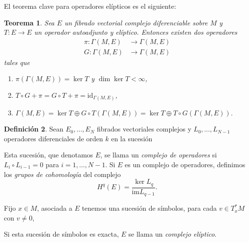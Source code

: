 \documentclass[12pt,a4paper]{article}
\newtheorem{thm}{Teorema}[section]
\theoremstyle{definition} \newtheorem{defn}[thm]{Definición}
\theoremstyle{definition} \newtheorem{ejemplo}[thm]{Ejemplo}
\theoremstyle{definition} \newtheorem{ejercicio}[thm]{Ejercicio}
\theoremstyle{remark} \newtheorem*{obs}{Observación}
\newcommand{\id}{\mathrm{id}}
\begin{document}
   El teorema clave para operadores elípticos es el siguiente:
   \begin{thm}\label{espectral}
     Sea $E$ un fibrado vectorial complejo diferenciable sobre $M$ y $T:E\rightarrow E$ un operador autoadjunto y elíptico. Entonces existen dos operadores
     \begin{align*}
       \pi:  \Gamma(M,E) &\longrightarrow \Gamma(M,E) \\ 
	 G:  \Gamma(M,E) &\longrightarrow \Gamma(M,E) 
       \end{align*}
       tales que
       \begin{enumerate}
	 \item $\pi(\Gamma(M,E))=\ker T$ y $\dim \ker T < \infty$,
	 \item $T\circ G +\pi=G\circ T + \pi = \id_{\Gamma(M,E)}$, 
	 \item $\Gamma(M,E)= \ker T \oplus G\circ T(\Gamma(M,E)) = \ker T \oplus T\circ G(\Gamma(M,E))$.
       \end{enumerate}
   \end{thm}
   \begin{defn}
     Sean $E_0,\dots,E_N$ fibrados vectoriales complejos y $L_0,\dots,L_{N-1}$ operadores diferenciales de orden $k$ en la sucesión
     \begin{center}
     \end{center}
     Esta sucesión, que denotamos $E$, se llama un \emph{complejo de operadores} si $L_i\circ L_{i-1}=0$ para $i=1,\dots,N-1$. Si $E$ es un complejo de operadores, definimos los \emph{grupos de cohomología} del complejo
     \begin{equation*}
       H^q(E)=\frac{\ker L_q}{\mathrm{im} L_{q-1}}.
     \end{equation*}

Fijo $x\in M$, asociada a $E$ tenemos una sucesión de símbolos, para cada $v\in T^*_xM$ con $v\neq 0$,
     \begin{center}
     \end{center}
     Si esta sucesión de símbolos es exacta, $E$ se llama un \emph{complejo elíptico}.
   \end{defn}
\end{document}
